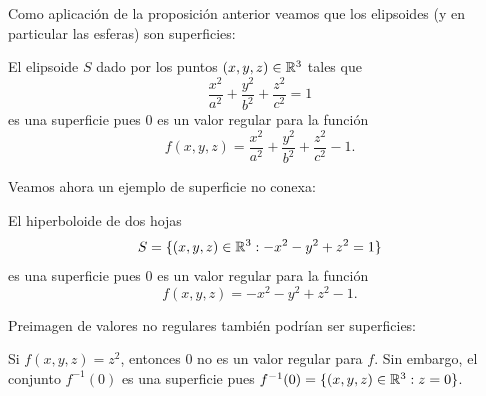 Como aplicación de la proposición anterior veamos que los elipsoides (y en
particular las esferas) son superficies: 

\begin{example}
	El elipsoide $S$ dado por los puntos $(x,y,z)\in\mathbb{R}^3$ tales que 
	\[
		\frac{x^2}{a^2}+\frac{y^2}{b^2}+\frac{z^2}{c^2}=1
	\]
	es una superficie
	pues $0$ es un valor regular para la función
	\[
		f(x,y,z)=\frac{x^2}{a^2}+\frac{y^2}{b^2}+\frac{z^2}{c^2}-1. 
	\]
\end{example}

Veamos ahora un ejemplo de superficie no conexa:

\begin{example}
	El hiperboloide de dos hojas
	\[
		S=\{(x,y,z)\in\mathbb{R}^3:-x^2-y^2+z^2=1\}
	\]
	es una superficie pues $0$ es un valor regular para la función 
	\[
		f(x,y,z)=-x^2-y^2+z^2-1.
	\]
\end{example}

Preimagen de valores no regulares también podrían ser superficies:

\begin{example}
	Si $f(x,y,z)=z^2$, entonces $0$ no es un valor regular para $f$. Sin
	embargo, el conjunto $f^{-1}(0)$ es una superficie pues
	$f^{-1}(0)=\{(x,y,z)\in\mathbb{R}^3:z=0\}$.
\end{example}

%
%

